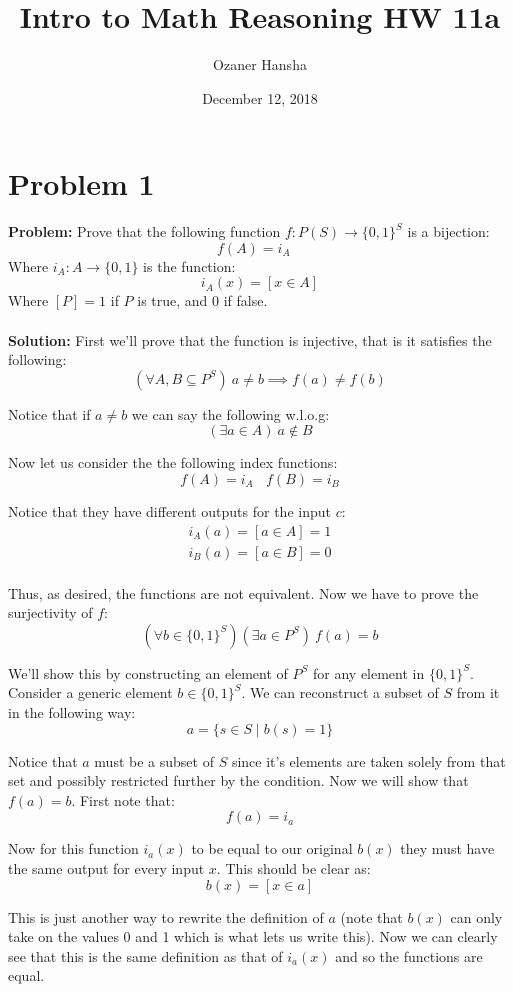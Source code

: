 \documentclass{article}
\begin{document}
\title{Intro to Math Reasoning HW 11a}
\author{Ozaner Hansha}
\date{December 12, 2018}
\maketitle

\section*{Problem 1}
\textbf{Problem:} Prove that the following function $f:P(S)\to \{0,1\}^S$ is a bijection:
$$f(A)=i_A\ \ \ \ $$
Where $i_A:A\to\{0,1\}$ is the function:
$$i_A(x)=[x\in A]$$
Where $[P]=1$ if $P$ is true, and 0 if false.
\\\\
\textbf{Solution:} First we'll prove that the function is injective, that is it satisfies the following:
$$(\forall A,B\subseteq P^S)\ a\not=b\implies f(a)\not=f(b)$$

Notice that if $a\not=b$ we can say the following w.l.o.g:
$$(\exists a\in A)\ a\not\in B$$

Now let us consider the the following index functions:
$$f(A)=i_A\ \ \ \ f(B)=i_B$$

Notice that they have different outputs for the input $c$:
\begin{align*}
  i_A(a)=[a\in A]=1\\
  i_B(a)=[a\in B]=0\\
\end{align*}

Thus, as desired, the functions are not equivalent. Now we have to prove the surjectivity of $f$:
$$(\forall b\in\{0,1\}^S)(\exists a\in P^S)\ f(a)=b$$

We'll show this by constructing an element of $P^S$ for any element in $\{0,1\}^S$. Consider a generic element $b\in\{0,1\}^S$. We can reconstruct a subset of $S$ from it in the following way:
$$a=\{s\in S\mid b(s)=1\}$$

Notice that $a$ must be a subset of $S$ since it's elements are taken solely from that set and possibly restricted further by the condition. Now we will show that $f(a)=b$. First note that:
$$f(a)=i_a$$

Now for this function $i_a(x)$ to be equal to our original $b(x)$ they must have the same output for every input $x$. This should be clear as:
$$b(x)=[x\in a]$$

This is just another way to rewrite the definition of $a$ (note that $b(x)$ can only take on the values 0 and 1 which is what lets us write this). Now we can clearly see that this is the same definition as that of $i_a(x)$ and so the functions are equal.
\end{document}
